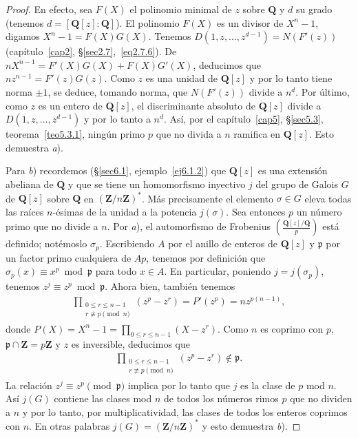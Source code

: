 \documentclass[10pt,oneside,bibtotoc,smallheadings,leqno,a5paper,DIV=12]{scrbook}
\newcommand{\QQ}{\mathbf{Q}}
\newcommand{\ZZ}{\mathbf{Z}}
\newcommand{\idl}[1]{\mathfrak{#1}}
\numberwithin{equation}{section}
\theoremstyle{defi}
\theoremstyle{enonce}
\theoremstyle{rem}
\numberwithin{theorem}{section}
\numberwithin{proposition}{section}
\numberwithin{definition}{section}
\numberwithin{lemma}{section}
\numberwithin{corollary}{section}
\numberwithin{example}{section}
\numberwithin{footnote}{section}%
\begin{document}
\begin{proof}
En efecto, sea $F(X)$ el polinomio minimal de $z$ sobre $\QQ$ y $d$ su grado
(tenemos $d = [\QQ[z]:\QQ]$). El polinomio $F(X)$ es un divisor de $X^{n}-1$, digamos
$X^{n}-1=F(X)G(X)$. Tenemos $D(1,z,\dots,z^{d-1}) = N(F'(z))$ (cap\'itulo~\ref{cap2}, \S\ref{sec2.7},~\eqref{eq2.7.6}).
De $nX^{n-1}=F'(X)G(X)+F(X)G'(X)$, deducimos que $nz^{n-1}=F'(z)G(z)$. Como $z$ es una unidad de
$\QQ[z]$ y por lo tanto tiene norma $\pm 1$, se deduce, tomando norma, que $N(F'(z))$ divide a $n^{d}$.
Por \'ultimo, como $z$ es un entero de $\QQ[z]$, el discriminante absoluto de $\QQ[z]$ divide a
$D(1,z,\dots,z^{d-1})$ y por lo tanto a $n^{d}$. As\'i, por el cap\'itulo~\ref{cap5}, \S\ref{sec5.3},
teorema~\ref{teo5.3.1},
ning\'un primo $p$ que no divida a $n$ ramifica en $\QQ[z]$. Esto demuestra {\itshape a}).

Para {\itshape b}) recordemos (\S\ref{sec6.1}, ejemplo~\ref{ej6.1.2}) que $\QQ[z]$ es una extensi\'on abeliana de $\QQ$ y
que se tiene un homomorfismo inyectivo $j$ del grupo de Galois $G$ de $\QQ[z]$ sobre $\QQ$ en
$(\ZZ/n\ZZ)^{*}$. M\'as precisamente el elemento $\sigma\in G$ eleva todas las ra\'ices $n$-\'esimas de la
unidad a la potencia $j(\sigma)$. Sea entonces $p$ un n\'umero primo que no divide a $n$. Por {\itshape a}),
el automorfismo de Frobenius $\left(\frac{\QQ[z]/\QQ}{p}\right)$ est\'a definido; not\'emoslo $\sigma_{p}$.
Escribiendo $A$ por el anillo de enteros de $\QQ[z]$ y $\idl{p}$ por un factor primo cualquiera de $Ap$,
tenemos por definici\'on que $\sigma_{p}(x)\equiv x^{p}\bmod\idl{p}$ para todo $x\in A$. En particular, poniendo
$j = j(\sigma_{p})$, tenemos $z^{j}\equiv z^{p}\bmod\idl{p}$. Ahora bien, tambi\'en tenemos
\begin{gather*}
\prod_{\substack{0\leq r\leq n-1\\ r\not\equiv p\pmod n}}(z^{p}-z^{r})=P'(z^{p}) = nz^{p(n-1)},
\end{gather*}
donde $P(X) = X^{n}-1 = \prod_{0\leq r\leq n-1}(X-z^{r})$. Como $n$ es coprimo con $p$,
$\idl{p}\cap\ZZ = p\ZZ$ y $z$ es inversible, deducimos que
\begin{gather*}
\prod_{\substack{0\leq r\leq n-1\\ r\not\equiv p\pmod n}}(z^{p}-z^{r})\notin\idl{p}.
\end{gather*}
La relaci\'on $z^{j}\equiv z^{p}\pmod{\idl{p}}$ implica por lo tanto que $j$ es la clase de $p$
mod $n$. As\'i $j(G)$ contiene las clases mod $n$ de todos los n\'umeros rimos $p$ que no dividen a
$n$ y por lo tanto, por multiplicatividad, las clases de todos los enteros coprimos con $n$. En otras
palabras $j(G) = (\ZZ/n\ZZ)^{*}$ y esto demuestra {\itshape b}).
\end{proof}
\end{document}
